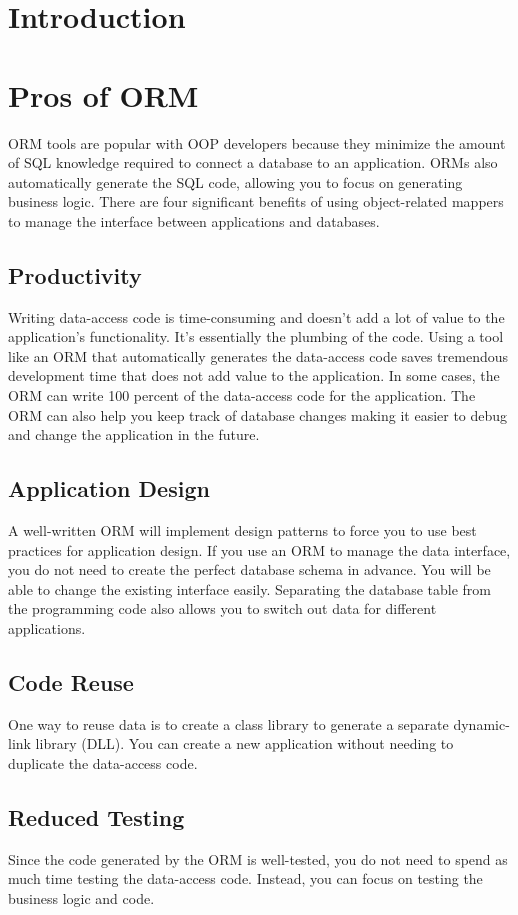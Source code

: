 \documentclass[10pt,a4paper,twoside]{article}
\begin{document}
\section{Introduction}


\section{Pros of ORM}
\item ORM tools are popular with OOP developers because they minimize the amount of SQL knowledge required to connect a database to an application. ORMs also automatically generate the SQL code, allowing you to focus on generating business logic. There are four significant benefits of using object-related mappers to manage the interface between applications and databases.
\subsection{Productivity}
\item Writing data-access code is time-consuming and doesn’t add a lot of value to the application’s functionality. It’s essentially the plumbing of the code. Using a tool like an ORM that automatically generates the data-access code saves tremendous development time that does not add value to the application. In some cases, the ORM can write 100 percent of the data-access code for the application. The ORM can also help you keep track of database changes making it easier to debug and change the application in the future.
\subsection{Application Design}
A well-written ORM will implement design patterns to force you to use best practices for application design. If you use an ORM to manage the data interface, you do not need to create the perfect database schema in advance. You will be able to change the existing interface easily. Separating the database table from the programming code also allows you to switch out data for different applications.
\subsection{Code Reuse}
One way to reuse data is to create a class library to generate a separate dynamic-link library (DLL). You can create a new application without needing to duplicate the data-access code.
\subsection{Reduced Testing}
Since the code generated by the ORM is well-tested, you do not need to spend as much time testing the data-access code. Instead, you can focus on testing the business logic and code.
\end{document}
